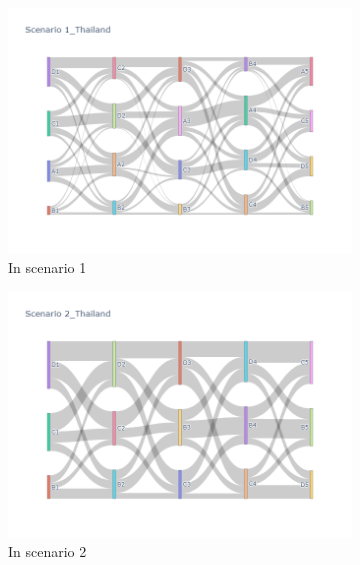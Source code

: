 \begin{figure}[h]
  \begin{subfigure}{0.5\textwidth}
    \centering
    \includegraphics[width=\textwidth]{Figure/figure34a.png}
    \caption{In scenario 1}
    \label{fig34a}
  \end{subfigure}
  \begin{subfigure}{0.5\textwidth}
    \centering
    \includegraphics[width=\linewidth]{Figure/figure34b.png}
    \caption{In scenario 2}
    \label{fig34b}
  \end{subfigure}
  \begin{subfigure}{0.5\textwidth}
    \centering

\end{subfigure}
\end{figure}
